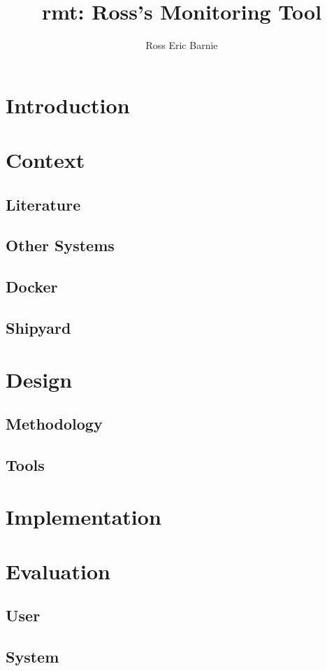 \documentclass{l4proj}
\title{rmt: Ross's Monitoring Tool}
\author{Ross Eric Barnie}
\begin{document}
\maketitle
\tableofcontents

\chapter{Introduction}


\chapter{Context}
\section{Literature}
\section{Other Systems}
\section{Docker}
\section{Shipyard}

\chapter{Design}
\section{Methodology}

\section{Tools}


\chapter{Implementation}

\chapter{Evaluation}
\section{User}
\section{System}



\end{document}
